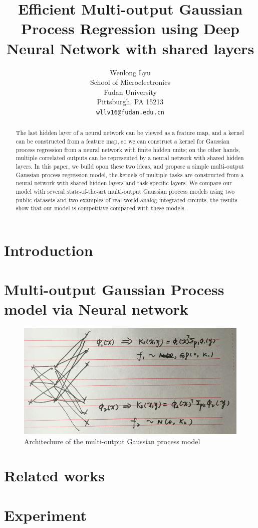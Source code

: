 \documentclass{article}
\title{Efficient Multi-output Gaussian Process Regression using Deep Neural Network with shared layers}
\author{
  Wenlong Lyu \\
  School of Microelectronics\\
  Fudan University\\
  Pittsburgh, PA 15213 \\
  \texttt{wllv16@fudan.edu.cn} \\
}
\begin{document}

\maketitle

\begin{abstract} 
    The last hidden layer of a neural network can be viewed as a feature map,
    and a kernel can be constructed from a feature map, so we can construct a
    kernel for Gaussian process regression from a neural network with finite
    hidden units; on the other hands, multiple correlated outputs can be
    represented by a neural network with shared hidden layers. In this paper,
    we build opon these two ideas, and propose a simple multi-output Gaussian
    process regression model, the kernels of multiple tasks are constructed
    from a neural network with shared hidden layers and task-specific layers.
    We compare our model with several state-of-the-art multi-output Gaussian
    process models using two public datasets and two examples of real-world
    analog integrated circuits, the results show that our model is competitive
    compared with these models.
\end{abstract}

\section{Introduction}



\section{Multi-output Gaussian Process model via Neural network}

\begin{figure}[!htb]
    \centering
    \includegraphics[width=\columnwidth]{./img/NN-MOGP.png}
    \caption{Architechure of the multi-output Gaussian process model}
\end{figure}

\section{Related works}


\section{Experiment}

\FloatBarrier



\end{document}
